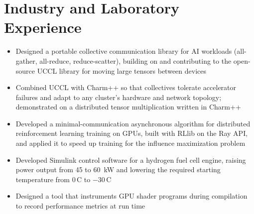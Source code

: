 \section{Industry and Laboratory Experience}

\begin{itemize}
  \item Designed a portable collective communication library for AI workloads
    (all-gather, all-reduce, reduce-scatter), building on and contributing to the
    open-source UCCL library for moving large tensors between devices
  \item Combined UCCL with Charm++ so that collectives tolerate accelerator failures and
    adapt to any cluster's hardware and network topology; demonstrated on a distributed
    tensor multiplication written in Charm++
\end{itemize}
\entrygap

\begin{itemize}
  \item Developed a minimal-communication asynchronous algorithm for distributed
    reinforcement learning training on GPUs, built with RLlib on the Ray API, and
    applied it to speed up training for the influence maximization problem
\end{itemize}
\entrygap

\begin{itemize}
  \item Developed Simulink control software for a hydrogen fuel cell engine, raising
    power output from 45 to 60~kW and lowering the required starting temperature from
    0\,\textdegree C to $-30$\,\textdegree C
\end{itemize}
\entrygap

\begin{itemize}
  \item Designed a tool that instruments GPU shader programs during compilation to record
    performance metrics at run time
\end{itemize}
